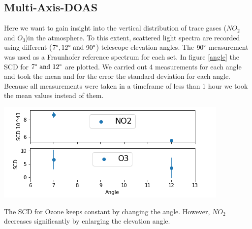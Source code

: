 \documentclass[12pt, english]{scrartcl} %
\newenvironment{Figure}
  {\par\medskip\noindent\minipage{\linewidth}}
  {\endminipage\par\medskip}
\begin{document}
\begin{multicols}{2}
\subsection{Multi-Axis-DOAS}
Here we want to gain insight into the vertical distribution of trace gases ($NO_2$ and $O_3$)in the atmosphere. To this extent, scattered light spectra are recorded using different ($7 \degree, 12 \degree \text{\ and\ } 90 \degree$) telescope elevation angles. The $90 \degree$ measurement was used as a Fraunhofer reference spectrum for each set. In figure \ref{angle} the SCD for $7 \degree \text{\ and\ } 12 \degree$ are plotted. We carried out 4 measurements for each angle and took the mean and for the error the standard deviation for each angle. 
Because all measurements were taken in a timeframe of less than 1 hour we took the mean values instead of them.
\begin{Figure}
 \centering
 \captionsetup{format=plain}
 \includegraphics[width=\linewidth]{graphics/anglescd2.png}
  \label{angle}
\end{Figure}
The SCD for Ozone keeps constant by changing the angle. However, $NO_2$ decreases significantly by enlarging the elevation angle.

\end{multicols}
\end{document}
